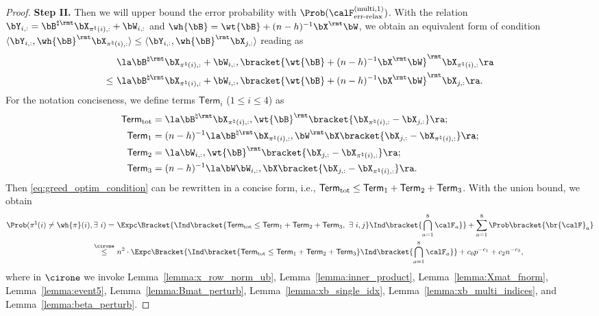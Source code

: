 \documentclass[11pt]{article}
\def \term {\mathsf{Term}}
\begin{document}
\begin{proof}
\vspace{0.1in}
\noindent
\textbf{Step II.}
Then we will upper bound the error probability with
$\Prob(\calF_{\textup{err-relax}}^{(\textup{multi}, 1)})$.
With the relation
$\bY_{i, :} = \bB^{\natural \rmt}  \bX_{\pi^{\natural}(i), :}+ \bW_{i, :}$
and $\wh{\bB} = \wt{\bB} + (n-h)^{-1}\bX^{\rmt}\bW$, we obtain an equivalent form of
condition
$\langle \bY_{i, :},  \wh{\bB}^{\rmt}\bX_{\pi^{\natural}(i), :} \rangle
\leq \langle \bY_{i, :}, \wh{\bB}^{\rmt} \bX_{j, :} \rangle$ reading as
\begin{align}
\label{eq:greed_optim_condition}
& \la \bB^{\natural \rmt}  \bX_{\pi^{\natural}(i), :}+ \bW_{i, :},
\bracket{\wt{\bB} +(n-h)^{-1}\bX^{\rmt}\bW}^{\rmt}
\bX_{\pi^{\natural}(i), :}
\ra \notag \\
\leq~&
\la \bB^{\natural \rmt}  \bX_{\pi^{\natural}(i), :}+ \bW_{i, :},
\bracket{\wt{\bB} + (n-h)^{-1}\bX^{\rmt}\bW}^{\rmt}
\bX_{j, :}\ra.
\end{align}
For the notation conciseness, we define terms
$\term_i$ ($1\leq i \leq 4$) as
\begin{align}
\term_{\textup{tot}}&= \la \bB^{\natural \rmt}  \bX_{\pi^{\natural}(i), :}, \wt{\bB}^{\rmt}
\bracket{\bX_{\pi^{\natural}(i), :} -  \bX_{j, :}}\ra; \label{eq:term1_def}\\
\term_{1} &= (n-h)^{-1}\la \bB^{\natural \rmt}  \bX_{\pi^{\natural}(i), :}, \bW^{\rmt}\bX\bracket{\bX_{j, :} - \bX_{\pi^{\natural}(i), :}} \ra; \label{eq:term2_def}\\
\term_{2} &= \la \bW_{i, :}, \wt{\bB}^{\rmt}\bracket{\bX_{j, :} - \bX_{\pi^{\natural}(i), :}} \ra;\label{eq:term3_def} \\
\term_{3} &= (n-h)^{-1}\la \bW\bW_{i, :}, \bX\bracket{\bX_{j, :} - \bX_{\pi^{\natural}(i), :}} \ra. \label{eq:term4_def}
\end{align}
Then \eqref{eq:greed_optim_condition} can be rewritten in a concise form, i.e.,
$\term_{\textup{tot}} \leq \term_{1} + \term_{2} + \term_{3}$. With the union bound,
we obtain
\begin{align}
\label{eq:main_theorem_tot}
\Prob(\pi^{\natural}(i) \neq \wh{\pi}(i), \exists~i)
=~& \Expc\Bracket{\Ind\bracket{\term_{\textup{tot}} \leq \term_{1} + \term_{2} + \term_{3},~\exists~i, j}\Ind\bracket{\bigcap_{a=1}^8 \calF_a}} +
\sum_{a=1}^8 \Prob\bracket{\br{\calF}_a} \notag \\
\stackrel{\cirone}{\leq}~& n^2 \cdot \Expc\Bracket{\Ind\bracket{\term_{\textup{tot}} \leq \term_{1} + \term_{2} + \term_{3}}\Ind\bracket{\bigcap_{a=1}^8 \calF_a}} +
c_0 p^{-c_1} + c_2 n^{-c_3},
\end{align}
where in $\cirone$ we invoke Lemma~\ref{lemma:x_row_norm_ub}, Lemma~\ref{lemma:inner_product},
Lemma~\ref{lemma:Xmat_fnorm}, Lemma~\ref{lemma:event5},
Lemma~\ref{lemma:Bmat_perturb}, Lemma~\ref{lemma:xb_single_idx},
Lemma~\ref{lemma:xb_multi_indices}, and Lemma~\ref{lemma:beta_perturb}.


\end{proof}
\end{document}
